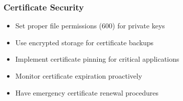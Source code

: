 \subsubsection{Certificate Security}

\begin{itemize}
    \item Set proper file permissions (600) for private keys
    \item Use encrypted storage for certificate backups
    \item Implement certificate pinning for critical applications
    \item Monitor certificate expiration proactively
    \item Have emergency certificate renewal procedures
\end{itemize}

